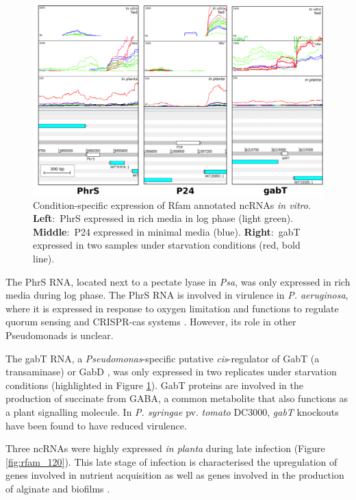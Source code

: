  \hfill
\begin{figure}[H]
    \centering
    \includegraphics[scale=0.9]{psa/psa_ncRNA/rfam_condition_specific.png}
    \caption[Condition-specific expression of Rfam annotated ncRNAs \textit{in vitro}]{Condition-specific expression of Rfam annotated ncRNAs \textit{in vitro}. \textbf{Left$:$} PhrS expressed in rich media in log phase (light green). \textbf{Middle$:$} P24 expressed in minimal media (blue). \textbf{Right$:$} gabT expressed in two samples under starvation conditions (red, bold line).}
    \label{fig:rfam_specific}
\end{figure}

The PhrS RNA, located next to a pectate lyase in \textit{Psa}, was only expressed in rich media during log phase. The PhrS RNA is involved in virulence in \textit{P. aeruginosa}, where it is expressed in response to oxygen limitation and functions to regulate quorum sensing \citep{Sonnleitner2011-jk} and CRISPR-cas systems \citep{Lin2019-ks}. However, its role in other Pseudomonads is unclear.

The gabT RNA, a \textit{Pseudomonas}-specific putative \textit{cis}-regulator of GabT (a transaminase) or GabD \citep{Weinberg2010-gu}, was only expressed in two replicates under starvation conditions (highlighted in Figure \ref{fig:rfam_specific}). GabT proteins are involved in the production of succinate from GABA, a common metabolite that also functions as a plant signalling molecule. In \textit{P. syringae} pv. \textit{tomato} DC3000, \textit{gabT} knockouts have been found to have reduced virulence.

Three ncRNAs were highly expressed \textit{in planta} during late infection (Figure \ref{fig:rfam_120}). This late stage of infection is characterised the upregulation of genes involved in nutrient acquisition as well as genes involved in the production of alginate and biofilms \citep{McAtee_2018x}. 

